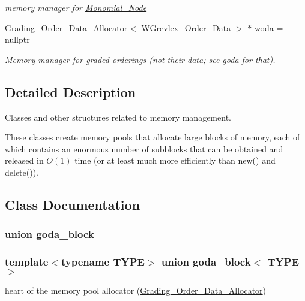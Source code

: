 \begin{DoxyCompactItemize}
\begin{DoxyCompactList}\small\item\em memory manager for \hyperlink{group__polygroup_class_monomial___node}{Monomial\+\_\+\+Node} \end{DoxyCompactList}\item 
\hyperlink{group__memorygroup_class_grading___order___data___allocator}{Grading\+\_\+\+Order\+\_\+\+Data\+\_\+\+Allocator}$<$ \hyperlink{group__orderinggroup_class_w_grevlex___order___data}{W\+Grevlex\+\_\+\+Order\+\_\+\+Data} $>$ $\ast$ \hyperlink{group__memorygroup_ga929e61b883d430fc6909a80fdb9ebb83}{woda} = nullptr
\begin{DoxyCompactList}\small\item\em Memory manager for graded orderings (not their data; see goda for that). \end{DoxyCompactList}\end{DoxyCompactItemize}


\subsection{Detailed Description}
Classes and other structures related to memory management. 

These classes create memory pools that allocate large blocks of memory, each of which contains an enormous number of subblocks that can be obtained and released in $O(1)$ time (or at least much more efficiently than {\ttfamily new()} and {\ttfamily delete()}). 

\subsection{Class Documentation}
\label{uniongoda__block}
\subsubsection{union goda\+\_\+block}
\subsubsection*{template$<$typename T\+Y\+PE$>$\newline
union goda\+\_\+block$<$ T\+Y\+P\+E $>$}

heart of the memory pool allocator (\hyperlink{group__memorygroup_class_grading___order___data___allocator}{Grading\+\_\+\+Order\+\_\+\+Data\+\_\+\+Allocator}) 

